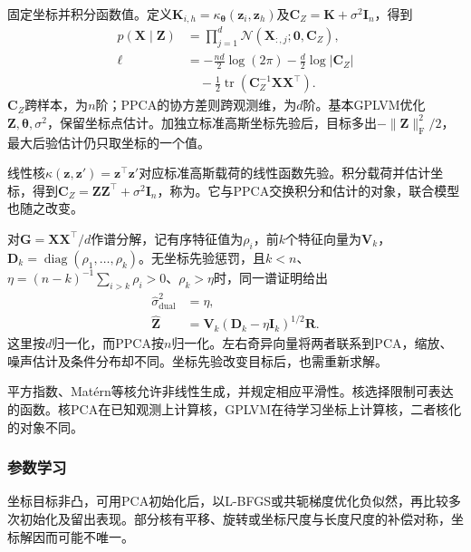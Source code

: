 固定坐标并积分函数值。定义$\bm{K}_{i,h}=\kappa_{\bm{\theta}}(\bm{z}_i,\bm{z}_h)$及$\bm{C}_Z=\bm{K}+\sigma^2\bm{I}_n$，得到
\begin{equation}
\label{eq:dim-gplvm-likelihood}
\begin{aligned}
p(\bm{X}\mid\bm{Z})
&=\prod_{j=1}^d
\mathcal{N}(\bm{X}_{:,j};\bm{0},\bm{C}_Z),\\
\ell&=-\frac{nd}{2}\log(2\pi)
-\frac{d}{2}\log|\bm{C}_Z|\\
&\quad-\frac{1}{2}
\operatorname{tr}(\bm{C}_Z^{-1}\bm{X}\bm{X}^\top).
\end{aligned}
\end{equation}
$\bm{C}_Z$跨样本，为$n$阶；PPCA的协方差则跨观测维，为$d$阶。基本GPLVM优化$\bm{Z},\bm{\theta},\sigma^2$，保留坐标点估计。加独立标准高斯坐标先验后，目标多出$-\lVert\bm{Z}\rVert_{\mathrm{F}}^2/2$，最大后验估计仍只取坐标的一个值。

线性核$\kappa(\bm{z},\bm{z}')=\bm{z}^\top\bm{z}'$对应标准高斯载荷的线性函数先验。积分载荷并估计坐标，得到$\bm{C}_Z=\bm{Z}\bm{Z}^\top+\sigma^2\bm{I}_n$，称为。它与PPCA交换积分和估计的对象，联合模型也随之改变。

对$\bm{G}=\bm{X}\bm{X}^\top/d$作谱分解，记有序特征值为$\rho_i$，前$k$个特征向量为$\bm{V}_k$，$\bm{D}_k=\operatorname{diag}(\rho_1,\ldots,\rho_k)$。无坐标先验惩罚，且$k<n$、$\eta=(n-k)^{-1}\sum_{i>k}\rho_i>0$、$\rho_k>\eta$时，同一谱证明给出
\begin{equation}
\label{eq:dim-gplvm-dual}
\begin{aligned}
\hat{\sigma}_{\mathrm{dual}}^2&=\eta,\\
\hat{\bm{Z}}&=\bm{V}_k(\bm{D}_k-\eta\bm{I}_k)^{1/2}\bm{R}.
\end{aligned}
\end{equation}
这里按$d$归一化，而PPCA按$n$归一化。左右奇异向量将两者联系到PCA，缩放、噪声估计及条件分布却不同。坐标先验改变目标后，也需重新求解。

平方指数、Matérn等核允许非线性生成，并规定相应平滑性。核选择限制可表达的函数。核PCA在已知观测上计算核，GPLVM在待学习坐标上计算核，二者核化的对象不同。

\subsubsection{参数学习}
\label{sec:dim-gplvm-learning}

坐标目标非凸，可用PCA初始化后，以L-BFGS或共轭梯度优化负似然，再比较多次初始化及留出表现。部分核有平移、旋转或坐标尺度与长度尺度的补偿对称，坐标解因而可能不唯一。

